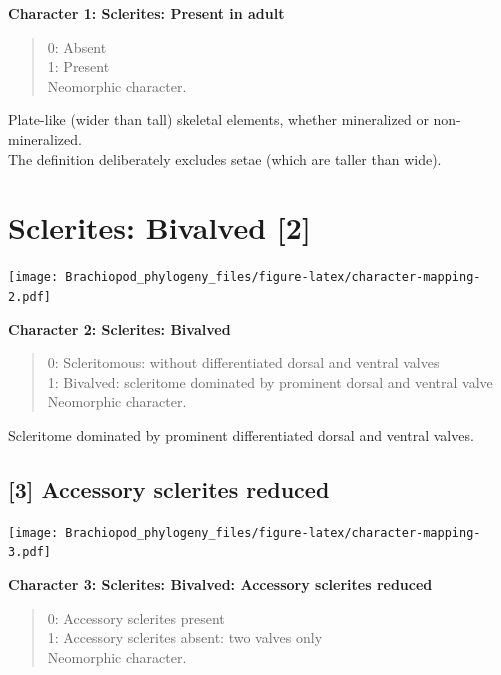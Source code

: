 \documentclass[]{book}
\theoremstyle{definition}
\theoremstyle{definition}
\theoremstyle{definition}
\theoremstyle{remark}
\begin{document}
\textbf{Character 1: Sclerites: Present in adult}

\begin{quote}
0: Absent\\
1: Present\\
Neomorphic character.
\end{quote}

Plate-like (wider than tall) skeletal elements, whether mineralized or
non-mineralized.\\
The definition deliberately excludes setae (which are taller than wide).

\hypertarget{sclerites-bivalved-2}{%
\section{Sclerites: Bivalved {[}2{]}}\label{sclerites-bivalved-2}}

\texttt{[image: Brachiopod\_phylogeny\_files/figure-latex/character-mapping-2.pdf]}

\textbf{Character 2: Sclerites: Bivalved}

\begin{quote}
0: Scleritomous: without differentiated dorsal and ventral valves\\
1: Bivalved: scleritome dominated by prominent dorsal and ventral
valve\\
Neomorphic character.
\end{quote}

Scleritome dominated by prominent differentiated dorsal and ventral
valves.

\hypertarget{accessory-sclerites-reduced}{%
\subsection*{{[}3{]} Accessory sclerites
reduced}\label{accessory-sclerites-reduced}}

\texttt{[image: Brachiopod\_phylogeny\_files/figure-latex/character-mapping-3.pdf]}

\textbf{Character 3: Sclerites: Bivalved: Accessory sclerites reduced}

\begin{quote}
0: Accessory sclerites present\\
1: Accessory sclerites absent: two valves only\\
Neomorphic character.
\end{quote}
\end{document}
